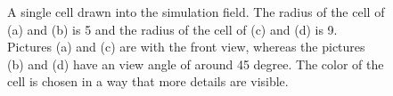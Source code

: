 \begin{figure}[ht]
	\begin{center}
	\end{center}
	\begin{center}
	\end{center}
	\caption[Drawn sphere cells with a radius of 5 and 9]{\label{img:DrawnSphereCellRadius5And9}A single cell drawn into the simulation field. The radius of the cell of (a) and (b) is 5 and the radius of the cell of (c) and (d) is 9. Pictures (a) and (c) are with the front view, whereas the
pictures (b) and (d) have an view angle of around 45 degree. The color of the cell is chosen in
a way that more details are visible.}
\end{figure}

